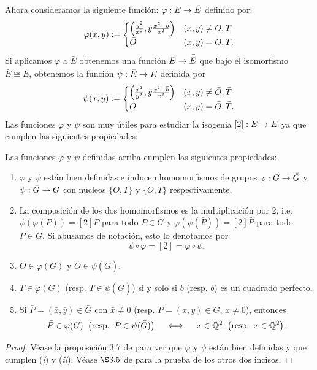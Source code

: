 Ahora consideramos la siguiente función: $\varphi:E\rightarrow \bar{E}$ definido por:
\[
	\varphi(x,y):=\begin{cases}
		\left( \tfrac{y^2}{x^2},y\tfrac{x^2-b}{x^2} \right) & (x,y)\neq O,T\\
		\bar{O} & (x,y)=O,T.
	\end{cases}
\]
Si aplicamos $\varphi$ a $\bar{E}$ obtenemos una función $\bar{E}\rightarrow\bar{\bar{E}}$ que bajo el isomorfismo $\bar{\bar{E}}\cong E$, obtenemos la función $\psi:\bar{E}\rightarrow E$ definida por
\[
	\psi(\bar{x},\bar{y}):=\begin{cases}
		\left( \tfrac{\bar{x}^2}{\bar{y}^2},\bar{y}\tfrac{\bar{x}^2-\bar{b}}{\bar{x}^2} \right) & (\bar{x},\bar{y})\neq \bar{O},\bar{T}\\
		O & (\bar{x},\bar{y})=\bar{O},\bar{T}.
	\end{cases}
\]
Las funciones $\varphi$ y $\psi$ son muy útiles para estudiar la isogenia $[2]:E\rightarrow E$ ya que cumplen las siguientes propiedades:

\begin{prop}\label{prop:descomponer-2}
	Las funciones $\varphi$ y $\psi$ definidas arriba cumplen las siguientes propiedades:
	\begin{enumerate}[label=(\roman*)]
		\item $\varphi$ y $\psi$ están bien definidas e inducen homomorfismos de grupos $\varphi:G\rightarrow \bar{G}$ y $\psi:\bar{G}\rightarrow G$ con núcleos $\{O,T\}$ y $\{\bar{O},\bar{T}\}$ respectivamente.
		\item\label{in:mult2} La composición de los dos homomorfismos es la multiplicación por 2, i.e. $\psi(\varphi(P))=[2]P$ para todo $P\in G$ y $\varphi(\psi(\bar{P}))=[2]\bar{P}$ para todo $\bar{P}\in\bar{G}$. Si abusamos de notación, esto lo denotamos por $$\psi\circ\varphi=[2]=\varphi\circ\psi.$$
		\item\label{in:0imagen} $\bar{O}\in\varphi(G)$ y $O\in\psi(\bar{G})$.
		\item\label{in:imagenTbar} $\bar{T}\in\varphi(G)$ (resp. $T\in\psi(\bar{G})$) si y solo si $\bar{b}$ (resp. $b$) es un cuadrado perfecto.
		\item\label{in:imagen} Si $\bar{P}=(\bar{x},\bar{y})\in\bar{G}$ con $\bar{x}\neq0$ (resp. $P=(x,y)\in G$, $x\neq0$), entonces
		\[
			\bar{P}\in\varphi(G)\;\;\big(\mathrm{resp}.\;\; P\in\psi(\bar{G})\big)\quad\iff\quad\bar{x}\in\mathbb{Q}^2\;\;\big(\mathrm{resp}.\;\; x\in\mathbb{Q}^2 \big).
		\]
	\end{enumerate}
\end{prop}
\begin{proof}
		Véase la proposición 3.7 de \cite{SilvermanTateRPOEC} para ver que $\varphi$ y $\psi$ están bien definidas y que cumplen (\emph{i}) y (\emph{ii}). Véase $\S3.5$ de \cite{SilvermanTateRPOEC} para la prueba de los otros dos incisos.
\end{proof}

